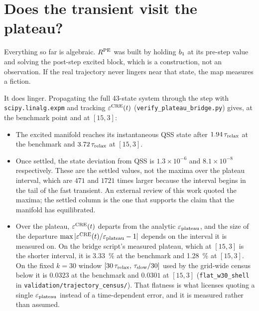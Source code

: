 \section{Does the transient visit the plateau?}
\label{sec:bridge}

Everything so far is algebraic. $R^{\mathrm{PE}}$ was built by holding $b_1$ at its
pre-step value and solving the post-step excited block, which is a construction,
not an observation. If the real trajectory never lingers near that state, the
map measures a fiction.

It does linger. Propagating the full 43-state system through the step with
\texttt{scipy.linalg.expm} and tracking $\varepsilon^{\mathrm{CRE}}(t)$
(\texttt{verify\_plateau\_bridge.py}) gives, at the benchmark point and at
$[15,3]$:

\begin{itemize}
  \item The excited manifold reaches its instantaneous QSS state after
    $1.94\,\tau_{\mathrm{relax}}$ at the benchmark and $3.72\,\tau_{\mathrm{relax}}$ at $[15,3]$.
  \item Once settled, the state deviation from QSS is $1.3\times10^{-6}$ and
    $8.1\times10^{-8}$ respectively. These are the settled values, not the
    maxima over the plateau interval, which are $471$ and $1721$ times larger
    because the interval begins in the tail of the fast transient. An external
    review of this work quoted the maxima; the settled column is the one that
    supports the claim that the manifold has equilibrated.
  \item Over the plateau, $\varepsilon^{\mathrm{CRE}}(t)$ departs from the analytic $\varepsilon_{\mathrm{plateau}}$,
    and the size of the departure $\max|\varepsilon^{\mathrm{CRE}}(t)/\varepsilon_{\mathrm{plateau}} - 1|$ depends on
    the interval it is measured on. On the bridge script's measured plateau,
    which at $[15,3]$ is the shorter interval, it is \SI{3.33}{\percent} at the
    benchmark and \SI{1.28}{\percent} at $[15,3]$. On the fixed $k=30$ window
    $[30\,\tau_{\mathrm{relax}},\,\tau_{\mathrm{slow}}/30]$ used by the grid-wide census below it is
    $0.0323$ at the benchmark and $0.0301$ at $[15,3]$
    (\texttt{flat\_w30\_shell} in \texttt{validation/trajectory\_census/}).
    That flatness is what licenses quoting a single $\varepsilon_{\mathrm{plateau}}$ instead of a
    time-dependent error, and it is measured rather than assumed.
\end{itemize}

